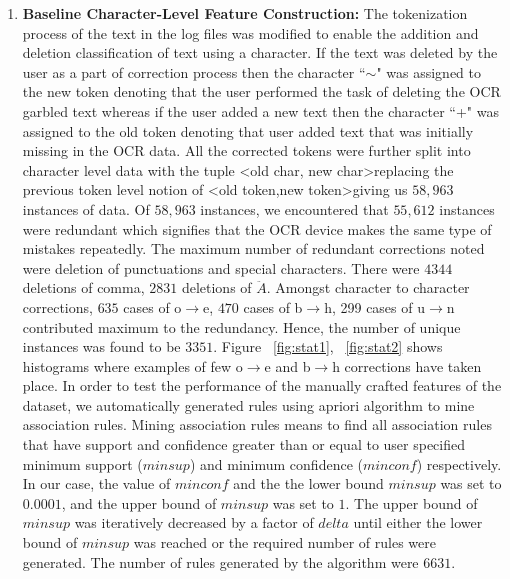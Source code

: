 \documentclass[10pt, conference, compsocconf]{IEEEtran}
\begin{document}
\begin{enumerate}
\item \textbf{Baseline Character-Level Feature Construction: }
The tokenization process of the text in the log files was modified to enable the addition and deletion classification of text using a character. If the text was deleted by the user as a part of correction process then the character ``$\sim$" was assigned to the new token denoting that the user performed the task of deleting the OCR garbled text whereas if the user added a new text  then the character ``+" was assigned to the old token denoting that user added text that was initially missing in the OCR data. All the corrected tokens were further split into character level data with the tuple \textless old char, new char\textgreater  replacing the previous token level notion of \textless old token,new token\textgreater giving us $58,963$ instances of data. Of $58,963$ instances, we encountered that $55,612$ instances were redundant which signifies that the OCR device makes the same type of mistakes repeatedly. The maximum number of redundant corrections noted were deletion of punctuations and special characters. There were $4344$ deletions of comma, $2831$ deletions of $\ddot{A}$. Amongst character to character corrections, $635$ cases of o$\rightarrow$e, $470$ cases of b$\rightarrow$h, 299 cases of u$\rightarrow$n contributed maximum to the redundancy. Hence, the number of unique instances was found to be $3351$. Figure ~\ref{fig:stat1}, ~\ref{fig:stat2} shows histograms where examples of few o$\rightarrow$e and b$\rightarrow$h corrections have taken place. In order to test the performance of the manually crafted features of the dataset, we automatically generated rules using apriori algorithm to mine association rules. Mining association rules means to find all association rules that have support and confidence greater than or equal to user specified minimum support ($minsup$) and minimum confidence ($minconf$) respectively. In our case, the value of $minconf$ and the the lower bound $minsup$ was set to $0.0001$, and the upper bound of $minsup$ was set to $1$. The upper bound of $minsup$ was iteratively decreased by a factor of $delta$ until either the lower bound of $minsup$ was reached or the required number of rules were generated. The number of rules generated by the algorithm were $6631$.




\end{enumerate}
\end{document}
